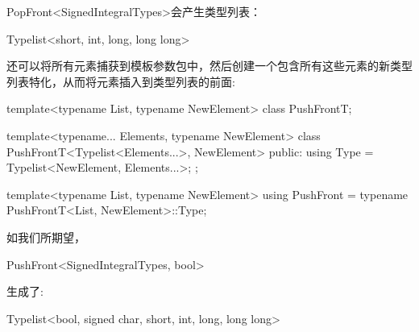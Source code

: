 PopFront<SignedIntegralTypes>会产生类型列表：

\begin{cpp}
Typelist<short, int, long, long long>
\end{cpp}

还可以将所有元素捕获到模板参数包中，然后创建一个包含所有这些元素的新类型列表特化，从而将元素插入到类型列表的前面:

\begin{cpp}
template<typename List, typename NewElement>
class PushFrontT;

template<typename... Elements, typename NewElement>
class PushFrontT<Typelist<Elements...>, NewElement> {
	public:
	using Type = Typelist<NewElement, Elements...>;
};

template<typename List, typename NewElement>
using PushFront = typename PushFrontT<List, NewElement>::Type;
\end{cpp}

如我们所期望，

\begin{cpp}
PushFront<SignedIntegralTypes, bool>
\end{cpp}

生成了:

\begin{cpp}
Typelist<bool, signed char, short, int, long, long long>
\end{cpp}









